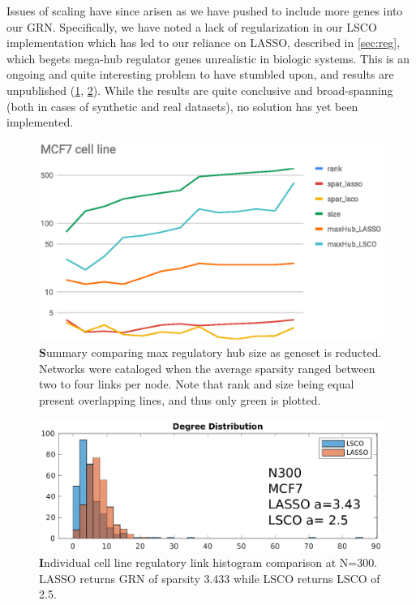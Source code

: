 Issues of scaling have since arisen as we have pushed to include more genes into our GRN. Specifically, we have noted a lack of regularization in our LSCO implementation which has led to our reliance on LASSO, described in \cref{sec:reg}, which begets mega-hub regulator genes unrealistic in biologic systems. This is an ongoing and quite interesting problem to have stumbled upon, and results are unpublished (\cref{fig:scaling}, \cref{fig:hubiness}). While the results are quite conclusive and broad-spanning (both in cases of synthetic and real datasets), no solution has yet been implemented.
\begin{figure}[H]
\centering
\includegraphics[width=.75\linewidth]{3/MCF7_cell_line.eps}
\caption{{\textbf Summary comparing max regulatory hub size as geneset is reducted.} Networks were cataloged when the average sparsity ranged between two to four links per node. Note that rank and size being equal present overlapping lines, and thus only green is plotted.
}
\label{fig:scaling}
\end{figure}

\begin{figure}[H]
\centering
\includegraphics[width=.75\linewidth]{3/hubineess.eps}
\caption{{\textbf Individual cell line regulatory link histogram comparison at N=300}. LASSO returns GRN of sparsity 3.433 while LSCO returns LSCO of 2.5.
}
\label{fig:hubiness}
\end{figure}





